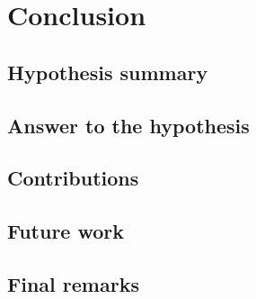 \chapter{Conclusion} \label{chap:conclusion} \minitoc

\section{Hypothesis summary}
\section{Answer to the hypothesis}
\section{Contributions}
\section{Future work}
\section{Final remarks}
